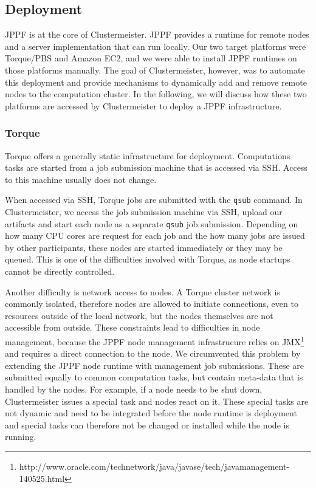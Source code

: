 \documentclass{article}
\begin{document}
\subsection{Deployment}

JPPF is at the core of Clustermeister. JPPF provides a runtime for remote nodes and a server implementation that can run locally. Our two target platforms were Torque/PBS and Amazon EC2, and we were able to install JPPF runtimes on those platforms manually. The goal of Clustermeister, however, was to automate this deployment and provide mechanisms to dynamically add and remove remote nodes to the computation cluster. In the following, we will discuss how these two platforms are accessed by Clustermeister to deploy a JPPF infrastructure.

\subsubsection{Torque}

Torque offers a generally static infrastructure for deployment. Computations tasks are started from a job submission machine that is accessed via SSH. Access to this machine usually does not change.

When accessed via SSH, Torque jobs are submitted with the \texttt{qsub} command. In Clustermeister, we access the job submission machine via SSH, upload our artifacts and start each node as a separate \texttt{qsub} job submission. Depending on how many CPU cores are request for each job and the how many jobs are issued by other participants, these nodes are started immediately or they may be queued. This is one of the difficulties involved with Torque, as node startups cannot be directly controlled.

Another difficulty is network access to nodes. A Torque cluster network is commonly isolated, therefore nodes are allowed to initiate connections, even to resources outside of the local network, but the nodes themselves are not accessible from outside. These constraints lead to difficulties in node management, because the JPPF node management infrastrucure relies on JMX\footnote{http://www.oracle.com/technetwork/java/javase/tech/javamanagement-140525.html} and requires a direct connection to the node. We circumvented this problem by extending the JPPF node runtime with management job submissions. These are submitted equally to common computation tasks, but contain meta-data that is handled by the nodes. For example, if a node needs to be shut down, Clustermeister issues a special task and nodes react on it. These special tasks are not dynamic and need to be integrated before the node runtime is deployment and special tasks can therefore not be changed or installed while the node is running.
\end{document}
